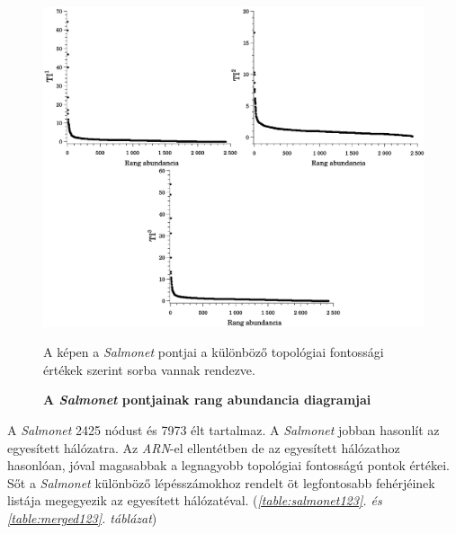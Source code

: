 \documentclass[a4paper,12pt]{article}
\newenvironment{imgdesc}{
		\small
		\singlespacing
		\begin{center}
		
	}{
		\end{center}	
	}
\begin{document}
			\begin{figure}[H]
					\includegraphics[scale=0.5]{img/salmonet_tis.pdf}
					\centering
					\caption{ \textbf{A \textit{Salmonet} pontjainak rang abundancia diagramjai}}
					\begin{imgdesc}
						A képen a \textit{Salmonet} pontjai a különböző topológiai fontossági értékek szerint sorba vannak rendezve. 
					\end{imgdesc}
		
					\label{fig:salmonet_stats}			 		 
				\end{figure}
		
			A \textit{Salmonet} 2425 nódust és 7973 élt tartalmaz. A \textit{Salmonet} jobban hasonlít az egyesített hálózatra. Az \textit{ARN}-el ellentétben de az egyesített hálózathoz hasonlóan, jóval  magasabbak a legnagyobb topológiai fontosságú pontok értékei. Sőt a \textit{Salmonet} különböző lépésszámokhoz rendelt öt legfontosabb fehérjéinek listája megegyezik az egyesített hálózatéval. (\textit{\ref{table:salmonet123}. és \ref{table:merged123}. táblázat}) 
										
\end{document}

